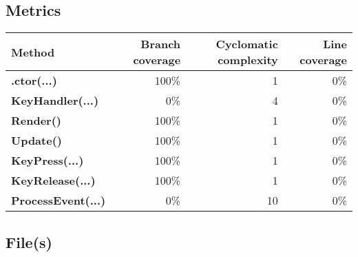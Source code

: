 \documentclass[a4paper,landscape,10pt]{article}
\begin{document}
\subsection{Metrics}
\begin{longtable}[l]{|l|r|r|r|}
\hline
\textbf{Method} & \textbf{Branch coverage} & \textbf{Cyclomatic complexity} & \textbf{Line coverage}\\
\hline
\textbf{.ctor(...)} & 100\% & 1 & 0\%\\
\hline
\textbf{KeyHandler(...)} & 0\% & 4 & 0\%\\
\hline
\textbf{Render()} & 100\% & 1 & 0\%\\
\hline
\textbf{Update()} & 100\% & 1 & 0\%\\
\hline
\textbf{KeyPress(...)} & 100\% & 1 & 0\%\\
\hline
\textbf{KeyRelease(...)} & 100\% & 1 & 0\%\\
\hline
\textbf{ProcessEvent(...)} & 0\% & 10 & 0\%\\
\hline
\end{longtable}
\subsection{File(s)}
\end{document}
